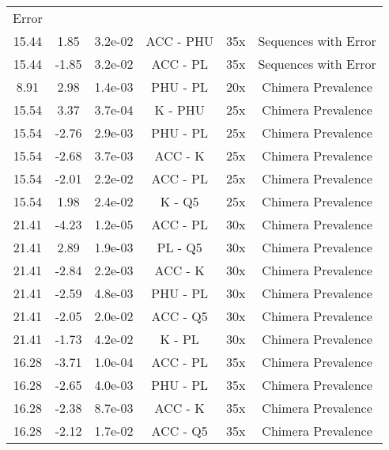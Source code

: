 \documentclass[11pt,]{article}
\begin{document}
\begin{longtable}[]{@{}cccccc@{}}
Error\tabularnewline
15.44 & 1.85 & 3.2e-02 & ACC - PHU & 35x & Sequences with
Error\tabularnewline
15.44 & -1.85 & 3.2e-02 & ACC - PL & 35x & Sequences with
Error\tabularnewline
8.91 & 2.98 & 1.4e-03 & PHU - PL & 20x & Chimera
Prevalence\tabularnewline
15.54 & 3.37 & 3.7e-04 & K - PHU & 25x & Chimera
Prevalence\tabularnewline
15.54 & -2.76 & 2.9e-03 & PHU - PL & 25x & Chimera
Prevalence\tabularnewline
15.54 & -2.68 & 3.7e-03 & ACC - K & 25x & Chimera
Prevalence\tabularnewline
15.54 & -2.01 & 2.2e-02 & ACC - PL & 25x & Chimera
Prevalence\tabularnewline
15.54 & 1.98 & 2.4e-02 & K - Q5 & 25x & Chimera
Prevalence\tabularnewline
21.41 & -4.23 & 1.2e-05 & ACC - PL & 30x & Chimera
Prevalence\tabularnewline
21.41 & 2.89 & 1.9e-03 & PL - Q5 & 30x & Chimera
Prevalence\tabularnewline
21.41 & -2.84 & 2.2e-03 & ACC - K & 30x & Chimera
Prevalence\tabularnewline
21.41 & -2.59 & 4.8e-03 & PHU - PL & 30x & Chimera
Prevalence\tabularnewline
21.41 & -2.05 & 2.0e-02 & ACC - Q5 & 30x & Chimera
Prevalence\tabularnewline
21.41 & -1.73 & 4.2e-02 & K - PL & 30x & Chimera
Prevalence\tabularnewline
16.28 & -3.71 & 1.0e-04 & ACC - PL & 35x & Chimera
Prevalence\tabularnewline
16.28 & -2.65 & 4.0e-03 & PHU - PL & 35x & Chimera
Prevalence\tabularnewline
16.28 & -2.38 & 8.7e-03 & ACC - K & 35x & Chimera
Prevalence\tabularnewline
16.28 & -2.12 & 1.7e-02 & ACC - Q5 & 35x & Chimera
Prevalence\tabularnewline
\bottomrule
\end{longtable}

\newpage
\end{document}
